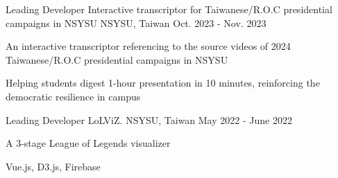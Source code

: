 

\begin{cventries}
  \cventry
    {Leading Developer} %
    {Interactive transcriptor for Taiwanese/R.O.C presidential campaigns in NSYSU} %
    {NSYSU, Taiwan} %
    {Oct. 2023 - Nov. 2023} %
    {
      \begin{cvitems} %
        \item {An interactive transcriptor referencing to the source videos of 2024 Taiwanese/R.O.C presidential campaigns in NSYSU}
        \item {Helping students digest 1-hour presentation in 10 minutes, reinforcing the democratic resilience in campus
        \hspace*{\fill}
        \href{https://ernestchu.github.io/lai-at-nsysu-231003/}{\faDesktop}
        \href{https://ernestchu.github.io/ko-at-nuk-231106/}{\faDesktop}
        }
      \end{cvitems}
    }

  \cventry
    {Leading Developer} %
    {LoLViZ.} %
    {NSYSU, Taiwan} %
    {May 2022 - June 2022} %
    {
      \begin{cvitems} %
        \item {A 3-stage League of Legends visualizer}
        \item {Vue.js, D3.js, Firebase
        \hspace*{\fill}
        \href{https://ernestchu.github.io/lol-viz/}{\faDesktop}
        \href{https://youtu.be/hQ1XeHcu0ns}{\faVideoCamera}
        \href{https://github.com/ernestchu/lol-viz}{\faGithub}
        }
      \end{cvitems}
    }


\end{cventries}
